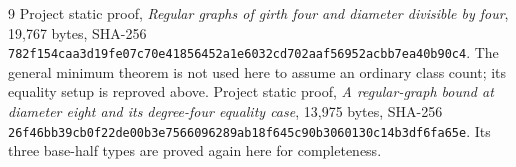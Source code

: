 \documentclass[11pt]{article}
\theoremstyle{definition}\newtheorem{definition}[theorem]{Definition}
\begin{document}
\begin{thebibliography}{9}
 Project static proof, \emph{Regular graphs of girth
four and diameter divisible by four}, 19,767 bytes, SHA-256
\texttt{782f154caa3d19fe07c70e41856452a1e6032cd702aaf56952acbb7ea40b90c4}.
The general minimum theorem is not used here to assume an ordinary
class count; its equality setup is reproved above.
 Project static proof, \emph{A regular-graph bound at
diameter eight and its degree-four equality case}, 13,975 bytes,
SHA-256 \texttt{26f46bb39cb0f22de00b3e7566096289ab18f645c90b3060130c14b3df6fa65e}.
Its three base-half types are proved again here for completeness.
\end{thebibliography}
\end{document}
